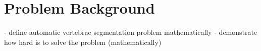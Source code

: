 \chapter{Problem Background}
\label{ch:u_net_architecture}

- define automatic vertebrae segmentation problem mathematically   
- demonstrate how hard is to solve the problem (mathematically)